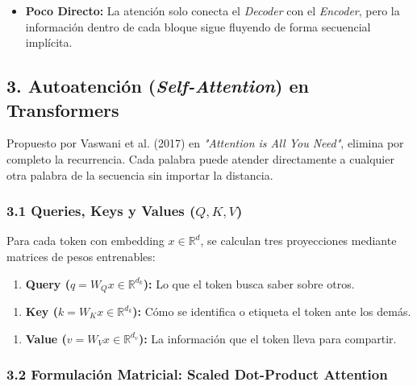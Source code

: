 \documentclass[11pt,oneside]{article}
\begin{document}
\begin{itemize}

\item \textbf{Poco Directo:} La atención solo conecta el \emph{Decoder} con el \emph{Encoder}, pero la información dentro de cada bloque sigue fluyendo de forma secuencial implícita.

\end{itemize}

\subsection{3. Autoatención (\emph{Self-Attention}) en Transformers}

Propuesto por Vaswani et al. (2017) en \emph{"Attention is All You Need"}, elimina por completo la recurrencia. Cada palabra puede atender directamente a cualquier otra palabra de la secuencia sin importar la distancia.

\subsubsection{3.1 Queries, Keys y Values (\(Q, K, V\))}

Para cada token con embedding \(x \in \mathbb{R}^d\), se calculan tres proyecciones mediante matrices de pesos entrenables:

\begin{enumerate}

\item \textbf{Query (\(q = W_Q x \in \mathbb{R}^{d_k}\)):} Lo que el token busca saber sobre otros.

\end{enumerate}

\begin{enumerate}

\item \textbf{Key (\(k = W_K x \in \mathbb{R}^{d_k}\)):} Cómo se identifica o etiqueta el token ante los demás.

\end{enumerate}

\begin{enumerate}

\item \textbf{Value (\(v = W_V x \in \mathbb{R}^{d_v}\)):} La información que el token lleva para compartir.

\end{enumerate}

\subsubsection{3.2 Formulación Matricial: Scaled Dot-Product Attention}
\end{document}
